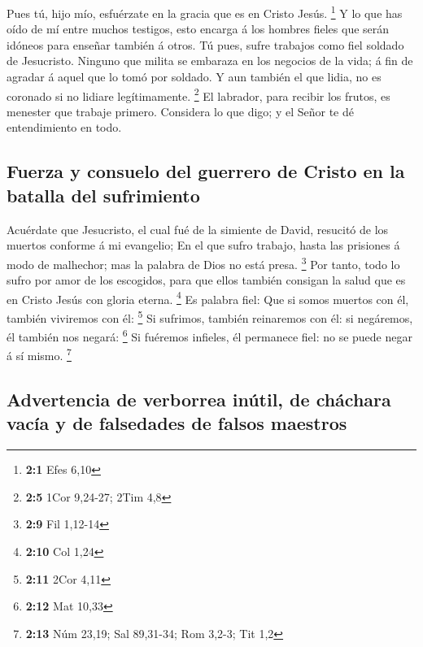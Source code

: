  Pues tú, hijo mío, esfuérzate en la gracia que es en Cristo
Jesús. \footnote{\textbf{2:1} Efes 6,10}  Y lo que has oído
de mí entre muchos testigos, esto encarga á los hombres fieles que serán
idóneos para enseñar también á otros.  Tú pues, sufre
trabajos como fiel soldado de Jesucristo.  Ninguno que
milita se embaraza en los negocios de la vida; á fin de agradar á aquel
que lo tomó por soldado.  Y aun también el que lidia, no es
coronado si no lidiare legítimamente. \footnote{\textbf{2:5} 1Cor
  9,24-27; 2Tim 4,8}  El labrador, para recibir los frutos,
es menester que trabaje primero.  Considera lo que digo; y
el Señor te dé entendimiento en todo.

\hypertarget{fuerza-y-consuelo-del-guerrero-de-cristo-en-la-batalla-del-sufrimiento}{%
\subsection{Fuerza y \hspace{0pt}\hspace{0pt}consuelo del guerrero de
Cristo en la batalla del
sufrimiento}\label{fuerza-y-consuelo-del-guerrero-de-cristo-en-la-batalla-del-sufrimiento}}

 Acuérdate que Jesucristo, el cual fué de la simiente de
David, resucitó de los muertos conforme á mi evangelio;  En
el que sufro trabajo, hasta las prisiones á modo de malhechor; mas la
palabra de Dios no está presa. \footnote{\textbf{2:9} Fil 1,12-14}
 Por tanto, todo lo sufro por amor de los escogidos, para
que ellos también consigan la salud que es en Cristo Jesús con gloria
eterna. \footnote{\textbf{2:10} Col 1,24}  Es palabra fiel:
Que si somos muertos con él, también viviremos con él: \footnote{\textbf{2:11}
  2Cor 4,11}  Si sufrimos, también reinaremos con él: si
negáremos, él también nos negará: \footnote{\textbf{2:12} Mat 10,33}
 Si fuéremos infieles, él permanece fiel: no se puede negar
á sí mismo. \footnote{\textbf{2:13} Núm 23,19; Sal 89,31-34; Rom 3,2-3;
  Tit 1,2}

\hypertarget{advertencia-de-verborrea-inuxfatil-de-chuxe1chara-vacuxeda-y-de-falsedades-de-falsos-maestros}{%
\subsection{Advertencia de verborrea inútil, de cháchara vacía y de
falsedades de falsos
maestros}\label{advertencia-de-verborrea-inuxfatil-de-chuxe1chara-vacuxeda-y-de-falsedades-de-falsos-maestros}}

